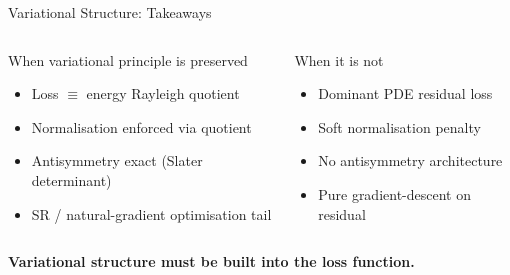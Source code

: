\documentclass[aspectratio=169,10pt]{beamer}
\begin{document}
\begin{frame}{Variational Structure: Takeaways}
  \begin{columns}[T]
      \begin{block}{When variational principle is preserved}
        \begin{itemize}
          \item Loss $\equiv$ energy Rayleigh quotient
          \item Normalisation enforced via quotient
          \item Antisymmetry exact (Slater determinant)
          \item SR / natural-gradient optimisation tail
        \end{itemize}
      \end{block}
      \begin{alertblock}{When it is not}
        \begin{itemize}
          \item Dominant PDE residual loss
          \item Soft normalisation penalty
          \item No antisymmetry architecture
          \item Pure gradient-descent on residual
        \end{itemize}
      \end{alertblock}
  \end{columns}

  \vspace{0.4cm}
  \begin{center}
    \large
    \textbf{Variational structure must be built into the loss function.}
  \end{center}
\end{frame}
\end{document}
